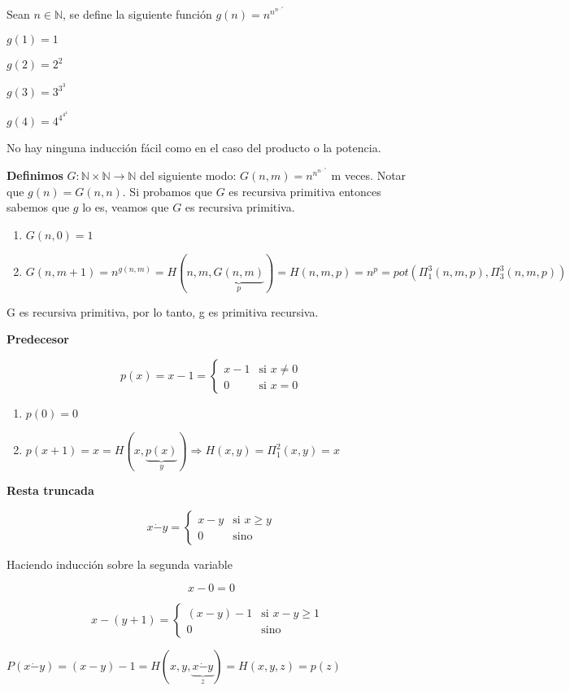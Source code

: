 \begin{example}
Sean $n \in \mathbb{N}$, se define la siguiente funci\'on $g(n) =  n^{n^{n^{\ldots^{n}}}}$
 
$g(1) = 1$
 
$g(2) = 2^{2}$
 
$g(3) = 3^{3^{3}}$
 
$g(4) = 4^{4^{4^{4}}}$
 
No hay ninguna inducci\'on f\'acil como en el caso del producto o la potencia.
 
 
\textbf{Definimos} $G : \mathbb{N} \times \mathbb{N} \rightarrow \mathbb{N}$ del siguiente modo: $G(n, m) = n^{n^{n^{\ldots^{n}}}}$ m veces. Notar que $g(n) = G(n, n)$. Si probamos que $G$ es recursiva primitiva entonces sabemos que $g$ lo es, veamos que $G$ es recursiva primitiva.
 
\begin{enumerate}
	\item[] $G(n, 0) = 1$
	\item[] $G(n, m + 1) = n^{g(n, m)} = H(n, m, \underbrace{G(n, m)}_{p}) = H(n, m, p) = n^{p} = pot(\varPi_{1}^{3}(n, m, p), \varPi_{3}^{3}(n, m, p))$
\end{enumerate}
 
G es recursiva primitiva, por lo tanto, g es primitiva recursiva.
 
\end{example}
 
\begin{example}
 
\textbf{Predecesor}
 
\[
p(x) = x - 1 =
\begin{cases}
x - 1		&\text{si $x \neq 0$}	\\
0			&\text{si $x = 0$}
\end{cases}
\]
 
\begin{enumerate}
	\item[] $p(0) = 0$
	\item[] $p(x + 1) = x = H(x, \underbrace{p(x)}_y) \Rightarrow H(x, y) = \varPi_{1}^{2}(x, y) = x$
\end{enumerate}
 
\end{example}
 
\begin{example}
\textbf{Resta truncada}
 
\[
x \dot{-} y =
\begin{cases}
x - y		&\text{si $x \geq y$}	\\
0			&\text{sino}
\end{cases}
\]
 
Haciendo inducci\'on sobre la segunda variable
 
\[
x - 0 = 0
\]
 
\[
x - (y + 1) =
\begin{cases}
(x - y) - 1 &\text{si $x - y \geq 1$  }	\\
0			&\text{sino} 
\end{cases}
\]
 
 
$P(x \dot{-} y) = (x - y) - 1 = H(x, y, \underbrace{x \dot{-} y}_{z}) = H (x, y, z) = p(z)$
 
\end{example}
 
